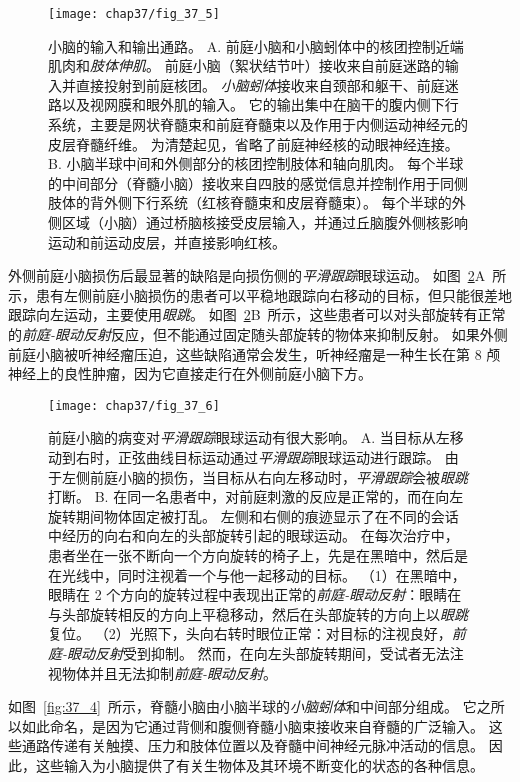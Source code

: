 \begin{figure}[htbp]
	\centering
	\texttt{[image: chap37/fig\_37\_5]}
	\caption{小脑的输入和输出通路。
		A. 前庭小脑和小脑蚓体中的核团控制近端肌肉和\textit{肢体伸肌}。
		前庭小脑（絮状结节叶）接收来自前庭迷路的输入并直接投射到前庭核团。
		\textit{小脑蚓体}接收来自颈部和躯干、前庭迷路以及视网膜和眼外肌的输入。
		它的输出集中在脑干的腹内侧下行系统，主要是网状脊髓束和前庭脊髓束以及作用于内侧运动神经元的皮层脊髓纤维。
		为清楚起见，省略了前庭神经核的动眼神经连接。
		B. 小脑半球中间和外侧部分的核团控制肢体和轴向肌肉。
		每个半球的中间部分（脊髓小脑）接收来自四肢的感觉信息并控制作用于同侧肢体的背外侧下行系统（红核脊髓束和皮层脊髓束）。
		每个半球的外侧区域（小脑）通过桥脑核接受皮层输入，并通过丘脑腹外侧核影响运动和前运动皮层，并直接影响红核。}
	\label{fig:37_5}
\end{figure}


外侧前庭小脑损伤后最显著的缺陷是向损伤侧的\textit{平滑跟踪}眼球运动。
如图~\ref{fig:37_6}A~所示，患有左侧前庭小脑损伤的患者可以平稳地跟踪向右移动的目标，但只能很差地跟踪向左运动，主要使用\textit{眼跳}。
如图~\ref{fig:37_6}B~所示，这些患者可以对头部旋转有正常的\textit{前庭-眼动反射}反应，但不能通过固定随头部旋转的物体来抑制反射。
如果外侧前庭小脑被听神经瘤压迫，这些缺陷通常会发生，听神经瘤是一种生长在第 8 颅神经上的良性肿瘤，因为它直接走行在外侧前庭小脑下方。


\begin{figure}[htbp]
	\centering
	\texttt{[image: chap37/fig\_37\_6]}
	\caption{前庭小脑的病变对\textit{平滑跟踪}眼球运动有很大影响。
		A. 当目标从左移动到右时，正弦曲线目标运动通过\textit{平滑跟踪}眼球运动进行跟踪。
		由于左侧前庭小脑的损伤，当目标从右向左移动时，\textit{平滑跟踪}会被\textit{眼跳}打断。
		B. 在同一名患者中，对前庭刺激的反应是正常的，而在向左旋转期间物体固定被打乱。
		左侧和右侧的痕迹显示了在不同的会话中经历的向右和向左的头部旋转引起的眼球运动。
		在每次治疗中，患者坐在一张不断向一个方向旋转的椅子上，先是在黑暗中，然后是在光线中，同时注视着一个与他一起移动的目标。
		（1）在黑暗中，眼睛在 2 个方向的旋转过程中表现出正常的\textit{前庭-眼动反射}：眼睛在与头部旋转相反的方向上平稳移动，然后在头部旋转的方向上以\textit{眼跳}复位。
		（2）光照下，头向右转时眼位正常：对目标的注视良好，\textit{前庭-眼动反射}受到抑制。
		然而，在向左头部旋转期间，受试者无法注视物体并且无法抑制\textit{前庭-眼动反射}。}
	\label{fig:37_6}
\end{figure}


如图~\ref{fig:37_4}~所示，脊髓小脑由小脑半球的\textit{小脑蚓体}和中间部分组成。
它之所以如此命名，是因为它通过背侧和腹侧脊髓小脑束接收来自脊髓的广泛输入。
这些通路传递有关触摸、压力和肢体位置以及脊髓中间神经元脉冲活动的信息。
因此，这些输入为小脑提供了有关生物体及其环境不断变化的状态的各种信息。


